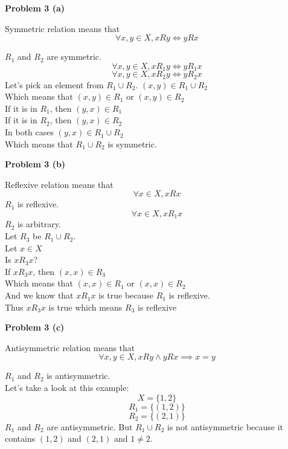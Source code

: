 \documentclass{article}
\begin{document}
\begin{flushleft}
   \textbf{\large Problem 3 (a)}
\end{flushleft}

Symmetric relation means that
\[
   \forall x, y \in X, xRy \iff yRx
\]

$R_1$ and $R_2$ are symmetric. \\
\[
   \forall x, y \in X, xR_1y \iff yR_1x
\]
\[ 
   \forall x, y \in X, xR_2y \iff yR_2x
\]
Let's pick an element from $R_1 \cup R_2$. $(x, y) \in R_1 \cup R_2$ \\
Which means that $(x, y) \in R_1$ or $(x, y) \in R_2$ \\
If it is in $R_1$, then $(y, x) \in R_1$ \\
If it is in $R_2$, then $(y, x) \in R_2$ \\
In both cases $(y, x) \in R_1 \cup R_2$ \\
Which means that $R_1 \cup R_2$ is symmetric. \\

\begin{flushleft}
   \textbf{\large Problem 3 (b)}
\end{flushleft}

Reflexive relation means that
\[
   \forall x \in X, xRx
\]
$R_1$ is reflexive.
\[
   \forall x \in X, xR_1x
\]
$R_2$ is arbitrary. \\
Let $R_3$ be $R_1 \cup R_2$. \\
Let $x \in X$ \\
Is $xR_3x$? \\
If $xR_3x$, then $(x, x) \in R_3$ \\
Which means that $(x, x) \in R_1$ or $(x, x) \in R_2$ \\
And we know that $xR_1x$ is true because $R_1$ is reflexive. \\
Thus $xR_3x$ is true which means $R_3$ is reflexive \\


\begin{flushleft}
   \textbf{\large Problem 3 (c)}
\end{flushleft}

Antisymmetric relation means that
\[
   \forall x, y \in X, xRy \land yRx \implies x = y
\]

$R_1$ and $R_2$ is antisymmetric. \\
Let's take a look at this example: \\
\[
   X = \{1, 2\}
\]
\[
   R_1 = \{(1, 2)\}
\]
\[
   R_2 = \{(2, 1)\}
\]
$R_1$ and $R_2$ are antisymmetric. But $R_1 \cup R_2$ is not antisymmetric because it contains $(1, 2)$ and $(2, 1)$ and $1 \not= 2$. \\
\end{document}

